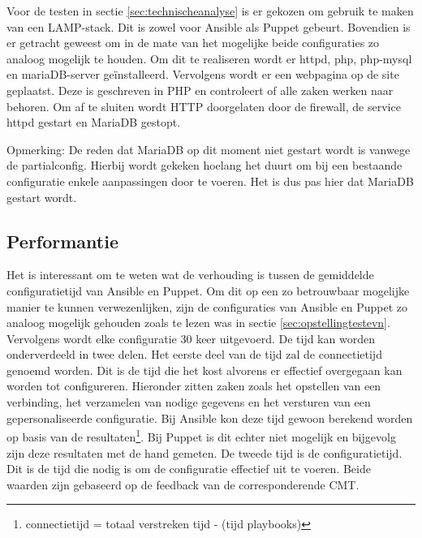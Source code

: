 Voor de testen in sectie \ref{sec:technischeanalyse} is er gekozen om gebruik te maken van een LAMP-stack. Dit is zowel voor Ansible als Puppet gebeurt. Bovendien is er getracht geweest om in de mate van het mogelijke beide configuraties zo analoog mogelijk te houden. Om dit te realiseren wordt er httpd, php, php-mysql en mariaDB-server ge\"installeerd. Vervolgens wordt er een webpagina op de site geplaatst. Deze is geschreven in PHP en controleert of alle zaken werken naar behoren. Om af te sluiten wordt HTTP doorgelaten door de firewall, de service httpd gestart en MariaDB gestopt. \newline

Opmerking: De reden dat MariaDB op dit moment niet gestart wordt is vanwege de \gls{partialconfig}. Hierbij wordt gekeken hoelang het duurt om bij een bestaande configuratie enkele aanpassingen door te voeren. Het is dus pas hier dat MariaDB gestart wordt.



 
\subsection{Performantie}

Het is interessant om te weten wat de verhouding is tussen de gemiddelde \gls{configuratietijd} van Ansible en Puppet. Om dit op een zo betrouwbaar mogelijke manier te kunnen verwezenlijken, zijn de configuraties van Ansible en Puppet zo analoog mogelijk gehouden zoals te lezen was in sectie \ref{sec:opstellingtestevn}. Vervolgens wordt elke configuratie 30 keer uitgevoerd. De tijd kan worden onderverdeeld in twee delen.\newline
Het eerste deel van de tijd zal de \gls{connectietijd} genoemd worden. Dit is de tijd die het kost alvorens er effectief overgegaan kan worden tot configureren. Hieronder zitten zaken zoals het opstellen van een verbinding, het verzamelen van nodige gegevens en het versturen van een gepersonaliseerde configuratie. Bij Ansible kon deze tijd gewoon berekend worden op basis van de resultaten\footnote{connectietijd = totaal verstreken tijd -  \unexpanded{$ \sum  $} (tijd playbooks)}. Bij Puppet is dit echter niet mogelijk en bijgevolg zijn deze resultaten met de hand gemeten.\newline
 De tweede tijd is de \gls{configuratietijd}. Dit is de tijd die nodig is om de configuratie effectief uit te voeren. Beide waarden zijn gebaseerd op de feedback van de corresponderende \gls{CMT}.





